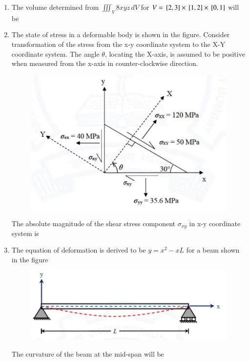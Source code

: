 \documentclass[journal,12pt,onecolumn]{article}
\theoremstyle{remark}
\begin{document}
\begin{enumerate}
\hfill{}

\item The volume determined from $\iiint_V 8xyz \,dV$ for $V = {}\left[2, 3\right] \times {}\left[1, 2\right] \times {}\left[0, 1\right]$ will be  \underline{\hspace{2cm}}

\hfill{}

\item The state of stress in a deformable body is shown in the figure. Consider transformation of the stress from the x-y coordinate system to the X-Y coordinate system. The angle $\theta$, locating the X-axis, is assumed to be positive when measured from the x-axis in counter-clockwise direction.
\begin{figure}[H]
    \centering
    \includegraphics[width=0.7\columnwidth]{figs/1q20.jpg}
    \caption{}
    \label{fig:q20}
\end{figure}
The absolute magnitude of the shear stress component $\sigma_{xy}$  in x-y coordinate system is \underline{\hspace{2cm}}

\hfill{}

\item The equation of deformation is derived to be $y = x^2-xL$ for a beam shown in the figure 
\begin{figure}[H]
    \centering
    \includegraphics[width=0.7\columnwidth]{figs/1q21.jpg}
    \caption{}
    \label{fig:q21}
\end{figure}
The curvature of the beam at the mid-span  will be \underline{\hspace{2cm}}


\end{enumerate}
\end{document}
